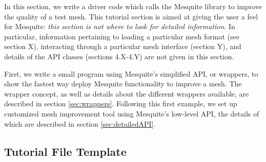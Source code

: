 In this section, we write a driver code which calls the Mesquite
library to improve the quality of a test mesh. This tutorial section
is aimed at giving the user a feel for Mesquite: \emph{this section is not
where to look for detailed information}. In particular, information
pertaining to loading a particular mesh format (see section X), 
interacting through a particular mesh interface (section Y), 
and details of the API classes (sections 4.X-4.Y) are not
given in this section.

First, we write a small program using Mesquite's simplified API, or
wrappers, to show the fastest way deploy Mesquite functionality to
improve a mesh.  The wrapper concept, as well as details about the
different wrappers available, are described in section
\ref{sec:wrappers}.  Following this first example, we set up customized mesh
improvement tool using Mesquite's low-level API, the details of which
are described in section \ref{sec:detailedAPI}.

\subsection{Tutorial File Template}
\label{sec:tutfile}

